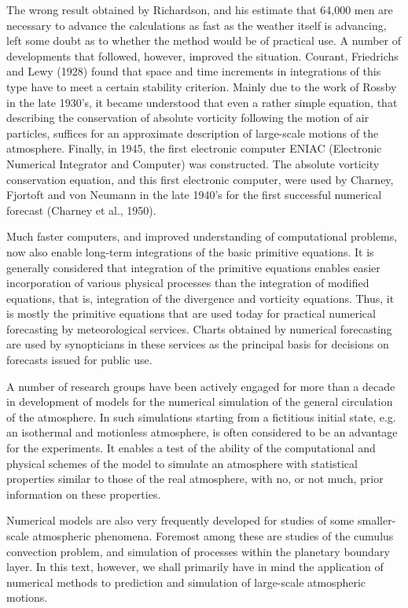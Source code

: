 The wrong result obtained by Richardson, and his estimate that 64,000 men are necessary to advance the calculations as fast as the weather itself is advancing, left some doubt as to whether the method would be of practical use. A number of developments that followed, however, improved the situation. Courant, Friedrichs and Lewy (1928) found that space and time increments in integrations of this type have to meet a certain stability criterion. Mainly due to the work of Rossby in the late 1930’s, it became understood that even a rather simple equation, that describing the conservation of absolute vorticity following the motion of air particles, suffices for an approximate description of large-scale motions of the atmosphere. Finally, in 1945, the first electronic computer ENIAC (Electronic Numerical Integrator and Computer) was constructed. The absolute vorticity conservation equation, and this first electronic computer, were used by Charney, Fjortoft and von Neumann in the late 1940’s for the first successful numerical forecast (Charney et al., 1950).

Much faster computers, and improved understanding of computational problems, now also enable long-term integrations of the basic primitive equations. It is generally considered that integration of the primitive equations enables easier incorporation of various physical processes than the integration of modified equations, that is, integration of the divergence and vorticity equations. Thus, it is mostly the primitive equations that are used today for practical numerical forecasting by meteorological services. Charts obtained by numerical forecasting are used by synopticians in these services as the principal basis for decisions on forecasts issued for public use.

A number of research groups have been actively engaged for more than a decade in development of models for the numerical simulation of the general circulation of the atmosphere. In such simulations starting from a fictitious initial state, e.g. an isothermal and motionless atmosphere, is often considered to be an advantage for the experiments. It enables a test of the ability of the computational and physical schemes of the model to simulate an atmosphere with statistical properties similar to those of the real atmosphere, with no, or not much, prior information on these properties.

Numerical models are also very frequently developed for studies of some smaller-scale atmospheric phenomena. Foremost among these are studies of the cumulus convection problem, and simulation of processes within the planetary boundary layer. In this text, however, we shall primarily have in mind the application of numerical methods to prediction and simulation of large-scale atmospheric motions.



